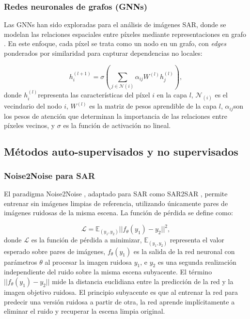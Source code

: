\subsubsection{Redes neuronales de grafos (GNNs)}

Las GNNs han sido exploradas para el análisis de imágenes SAR, donde se modelan las relaciones espaciales entre píxeles mediante representaciones en grafo \cite{yang2020learning}. En este enfoque, cada píxel se trata como un nodo en un grafo, con \emph{edges} ponderados por similaridad para capturar dependencias no locales:

\begin{equation}
	h_i^{(l+1)} = \sigma\left(\sum_{j \in \mathcal{N}(i)} \alpha_{ij} W^{(l)} h_j^{(l)}\right),
\end{equation}
donde $h_i^{(l)}$​ representa las características del píxel $i$ en la capa $l$, $\mathcal{N}_{(i)}$ es el vecindario del nodo $i$, $W^{(l)}$ es la matriz de pesos aprendible de la capa $l$, $\alpha_{ij}$​ son los pesos de atención que determinan la importancia de las relaciones entre píxeles vecinos, y $\sigma$ es la función de activación no lineal.

\subsection{Métodos auto-supervisados y no supervisados}

\subsubsection{Noise2Noise para SAR}

El paradigma Noise2Noise \cite{lehtinen2018noise2noise}, adaptado para SAR como SAR2SAR \cite{dalsasso2021sar2sar}, permite entrenar sin imágenes limpias de referencia, utilizando únicamente pares de imágenes ruidosas de la misma escena. La función de pérdida se define como:

\begin{equation}
	\mathcal{L} = \mathbb{E}_{(y_1, y_2)}||f_\theta(y_1) - y_2||^2,
\end{equation}
donde $\mathcal{L}$ es la función de pérdida a minimizar, $\mathbb{E}_{(y_1, y_2)}$ representa el valor esperado sobre pares de imágenes, $f_\theta(y_1)$ es la salida de la red neuronal con parámetros $\theta$ al procesar la imagen ruidosa $y_1$, e $y_2$ es una segunda realización independiente del ruido sobre la misma escena subyacente. El término $||f_\theta(y_1) - y_2||$ mide la distancia euclidiana entre la predicción de la red y la imagen objetivo ruidosa. El principio subyacente es que al entrenar la red para predecir una versión ruidosa a partir de otra, la red aprende implícitamente a eliminar el ruido y recuperar la escena limpia original.

